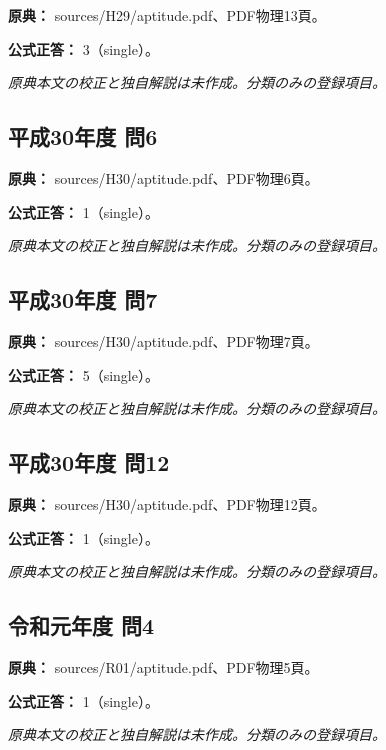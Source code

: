 \noindent\textbf{原典：} sources/H29/aptitude.pdf、PDF物理13頁。

\textbf{公式正答：} 3（single）。

\par\textit{原典本文の校正と独自解説は未作成。分類のみの登録項目。}

\subsection{平成30年度 問6}
\label{q:h30-reg-apt-06}

\noindent\textbf{原典：} sources/H30/aptitude.pdf、PDF物理6頁。

\textbf{公式正答：} 1（single）。

\par\textit{原典本文の校正と独自解説は未作成。分類のみの登録項目。}

\subsection{平成30年度 問7}
\label{q:h30-reg-apt-07}

\noindent\textbf{原典：} sources/H30/aptitude.pdf、PDF物理7頁。

\textbf{公式正答：} 5（single）。

\par\textit{原典本文の校正と独自解説は未作成。分類のみの登録項目。}

\subsection{平成30年度 問12}
\label{q:h30-reg-apt-12}

\noindent\textbf{原典：} sources/H30/aptitude.pdf、PDF物理12頁。

\textbf{公式正答：} 1（single）。

\par\textit{原典本文の校正と独自解説は未作成。分類のみの登録項目。}

\subsection{令和元年度 問4}
\label{q:r01-reg-apt-04}

\noindent\textbf{原典：} sources/R01/aptitude.pdf、PDF物理5頁。

\textbf{公式正答：} 1（single）。

\par\textit{原典本文の校正と独自解説は未作成。分類のみの登録項目。}

